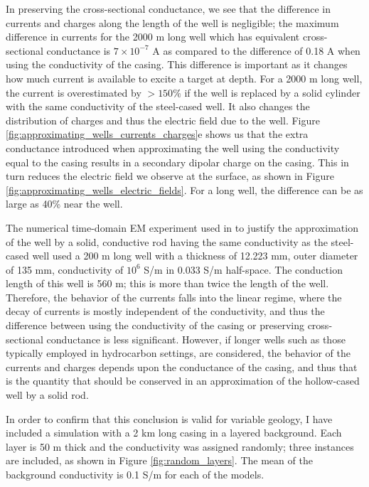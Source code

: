 In preserving the cross-sectional conductance, we see that the difference in currents and charges along the length of the well is negligible;  the maximum difference in currents for the 2000 m long well which has equivalent cross-sectional conductance is $7\times10^{-7}$ A as compared to the difference of 0.18 A when using the conductivity of the casing. This difference is important as it changes how much current is available to excite a target at depth. For a 2000 m long well, the current is overestimated by $> 150\%$ if the well is replaced by a solid cylinder with the same conductivity of the steel-cased well. It also changes the distribution of charges and thus the electric field due to the well. Figure \ref{fig:approximating_wells_currents_charges}e shows us that the extra conductance introduced when approximating the well using the conductivity equal to the casing results in a secondary dipolar charge on the casing. This in turn reduces the electric field we observe at the surface, as shown in Figure \ref{fig:approximating_wells_electric_fields}. For a long well, the difference can be as large as 40\% near the well.



The numerical time-domain EM experiment used in \cite{Um2015} to justify the approximation of the well by a solid, conductive rod having the same conductivity as the steel-cased well used a 200 m long well with a thickness of 12.223 mm, outer diameter of 135 mm, conductivity of $10^{6}$ S/m in 0.033 S/m half-space. The conduction length of this well is 560 m; this is more than twice the length of the well. Therefore, the behavior of the currents falls into the linear regime, where the decay of currents is mostly independent of the conductivity, and thus the difference between using the conductivity of the casing or preserving cross-sectional conductance is less significant. However, if longer wells such as those typically employed in hydrocarbon settings, are considered, the behavior of the currents and charges depends upon the conductance of the casing, and thus that is the quantity that should be conserved in an approximation of the hollow-cased well by a solid rod.

In order to confirm that this conclusion is valid for variable geology, I have included a simulation with a 2 km long casing in a layered background. Each layer is 50 m thick and the conductivity was assigned randomly; three instances are included, as shown in Figure \ref{fig:random_layers}. The mean of the background conductivity is 0.1 S/m for each of the models.

